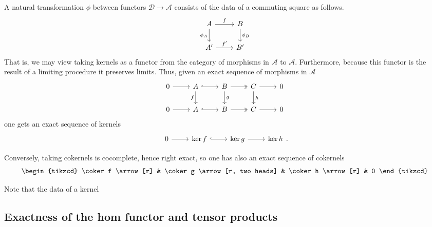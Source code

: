 \documentclass[main.tex]{subfiles}
\begin{document}
\begin{example}
  A natural transformation $\phi$ between functors $\mathcal{D} \to \mathcal{A}$ consists of the data of a commuting square as follows.
  \begin{equation*}
    \begin{tikzcd}
      A
      \arrow[r, "f"]
      \arrow[d, swap, "\phi_{A}"]
      & B
      \arrow[d, "\phi_{B}"]
      \\
      A'
      \arrow[r, "f'"]
      & B'
    \end{tikzcd}
  \end{equation*}
  That is, we may view taking kernels as a functor from the category of morphisms in $\mathcal{A}$ to $\mathcal{A}$. Furthermore, because this functor is the result of a limiting procedure it preserves limits. Thus, given an exact sequence of morphisms in $\mathcal{A}$
  \begin{equation*}
    \begin{tikzcd}
      0
      \arrow[r]
      & A
      \arrow[r, hook]
      \arrow[d, swap, "f"]
      & B
      \arrow[r, two heads]
      \arrow[d, "g"]
      & C
      \arrow[r]
      \arrow[d, "h"]
      & 0
      \\
      0
      \arrow[r]
      & A
      \arrow[r, hook]
      & B
      \arrow[r, two heads]
      & C
      \arrow[r]
      & 0
    \end{tikzcd}
  \end{equation*}
  one gets an exact sequence of kernels
  \begin{equation*}
    \begin{tikzcd}
      0
      \arrow[r]
      & \ker f
      \arrow[r, hook]
      & \ker g
      \arrow[r]
      & \ker h
    \end{tikzcd}.
  \end{equation*}

  Conversely, taking cokernels is cocomplete, hence right exact, so one has also an exact sequence of cokernels
  \begin{equation*}
    \begin{tikzcd}
      \coker f
      \arrow[r]
      & \coker g
      \arrow[r, two heads]
      & \coker h
      \arrow[r]
      & 0
    \end{tikzcd}
  \end{equation*}

  Note that the data of a kernel 
\end{example}

\subsection{Exactness of the hom functor and tensor products}
\label{ssc:exactness_of_the_hom_functor_and_tensor_products}
\end{document}
